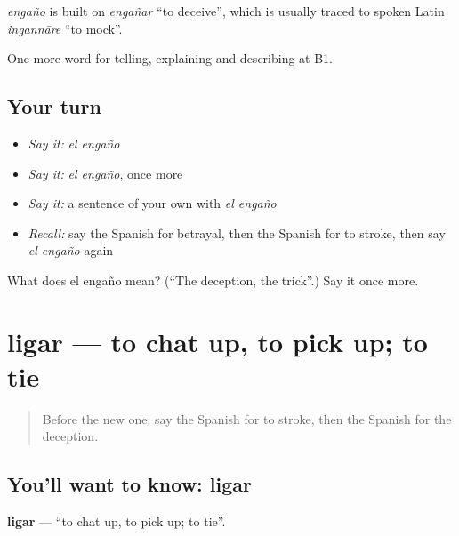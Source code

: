 \begin{cousinweb}
\emph{engaño} is built on \emph{engañar} \textquotedblleft{}to deceive\textquotedblright{}, which is usually traced to spoken Latin \emph{ingannāre} \textquotedblleft{}to mock\textquotedblright{}.
\end{cousinweb}

\begin{grammarlens}[title={What you've built}]
One more word for telling, explaining and describing at B1.
\end{grammarlens}

\subsection*{Your turn}
\begin{itemize}
\raggedright
  \item \emph{Say it:} \emph{el engaño}
  \item \emph{Say it:} \emph{el engaño}, once more
  \item \emph{Say it:} a sentence of your own with \emph{el engaño}
  \item \emph{Recall:} say the Spanish for betrayal, then the Spanish for to stroke, then say \emph{el engaño} again
\end{itemize}

\begin{tcolorbox}[breakable,colback=teal!4,colframe=teal!35!black,title={Before you move on}]
What does el engaño mean? (\textquotedblleft{}The deception, the trick\textquotedblright{}.) Say it once more.
\end{tcolorbox}
\section[ligar]{ligar — to chat up, to pick up; to tie}

\label{lesson:ES-C746-ligar}



\begin{quote}
Before the new one: say the Spanish for to stroke, then the Spanish for the deception.
\end{quote}

\subsection*{You'll want to know: ligar}
\textbf{ligar} — \textquotedblleft{}to chat up, to pick up; to tie\textquotedblright{}.

